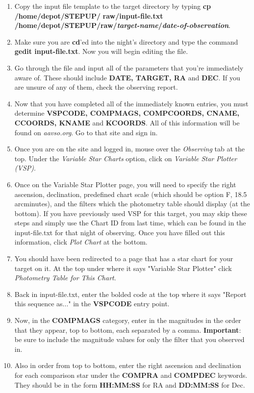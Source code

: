 \documentclass[11pt]{report}
\begin{document}
\begin{enumerate}
\item Copy the input file template to the target directory by typing {\bf cp /home/depot/STEPUP/} {\bf raw/input-file.txt /home/depot/STEPUP/raw/\emph{target-name}/\emph{date-of-observation}}. 
\item Make sure you are {\bf cd}'ed into the night's directory and type the command {\bf gedit input-file.txt}. Now you will begin editing the file.
\item Go through the file and input all of the parameters that you're immediately aware of. These should include {\bf DATE, TARGET, RA} and {\bf DEC}. If you are unsure of any of them, check the observing report.
\item Now that you have completed all of the immediately known entries, you must determine {\bf VSPCODE, COMPMAGS, COMPCOORDS, CNAME, CCOORDS, KNAME} and {\bf KCOORDS}. All of this information will be found on \emph{aavso.org}. Go to that site and sign in. 
\item Once you are on the site and logged in, mouse over the \emph{Observing} tab at the top. Under the \emph{Variable Star Charts} option, click on \emph{Variable Star Plotter (VSP)}. 
\item Once on the Variable Star Plotter page, you will need to specify the right ascension, declination, predefined chart scale (which should be option F, 18.5 arcminutes), and the filters which the photometry table should display (at the bottom). If you have previously used VSP for this target, you may skip these steps and simply use the Chart ID from last time, which can be found in the input-file.txt for that night of observing. Once you have filled out this information, click \emph{Plot Chart} at the bottom.
\item You should have been redirected to a page that has a star chart for your target on it. At the top under where it says "Variable Star Plotter" click \emph{Photometry Table for This Chart}.
\item Back in input-file.txt, enter the bolded code at the top where it says "Report this sequence as..." in the {\bf VSPCODE} entry point.
\item Now, in the {\bf COMPMAGS} category, enter in the magnitudes in the order that they appear, top to bottom, each separated by a comma. \textbf{Important}: be sure to include the magnitude values for only the filter that you observed in.
\item Also in order from top to bottom, enter the right ascension and declination for each comparison star under the {\bf COMPRA} and {\bf COMPDEC} keywords. They should be in the form {\bf HH:MM:SS} for RA and {\bf DD:MM:SS} for Dec.

\end{enumerate}
\end{document}
